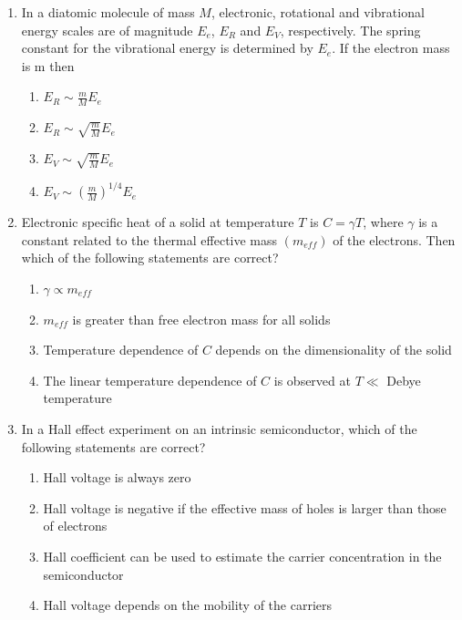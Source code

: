\documentclass[journal,12pt,onecolumn]{IEEEtran}
\theoremstyle{remark}
\begin{document}
\begin{enumerate}
\item
In a diatomic molecule of mass $M$, electronic, rotational and vibrational energy scales are of magnitude $E_e$, $E_R$ and $E_V$, respectively. The spring constant for the vibrational energy is determined by $E_e$. If the electron mass is m then
\begin{enumerate}
    \item $E_R \sim \frac{m}{M} E_e$
    \item $E_R \sim \sqrt{\frac{m}{M}} E_e$
    \item $E_V \sim \sqrt{\frac{m}{M}} E_e$
    \item $E_V \sim \left(\frac{m}{M}\right)^{1/4} E_e$
\end{enumerate}


\item
Electronic specific heat of a solid at temperature $T$ is $C = \gamma T$, where $\gamma$ is a constant related to the thermal effective mass $(m_{eff})$ of the electrons. Then which of the following statements are correct?
\begin{enumerate}
    \item $\gamma \propto m_{eff}$
    \item $m_{eff}$ is greater than free electron mass for all solids
    \item Temperature dependence of $C$ depends on the dimensionality of the solid
    \item The linear temperature dependence of $C$ is observed at $T \ll$ Debye temperature
\end{enumerate}


\item
In a Hall effect experiment on an intrinsic semiconductor, which of the following statements are correct?
\begin{enumerate}
    \item Hall voltage is always zero
    \item Hall voltage is negative if the effective mass of holes is larger than those of electrons
    \item Hall coefficient can be used to estimate the carrier concentration in the semiconductor
    \item Hall voltage depends on the mobility of the carriers
\end{enumerate}



\end{enumerate}
\end{document}
